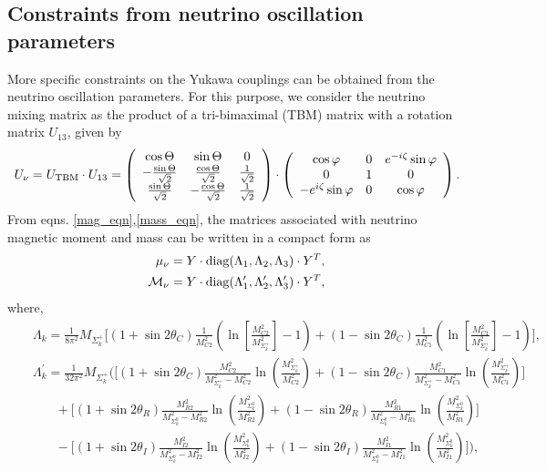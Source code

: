 \documentclass[aps, a4paper,superscriptaddress,12pt,preprintnumbers,floatfix,nofootinbib,amsmath,amssymb]{revtex4}
\newcommand{\nn}{\nonumber}
\begin{document}
\subsection{Constraints from neutrino oscillation parameters}
More specific constraints on the Yukawa couplings can be obtained from the neutrino oscillation parameters. For this purpose, we consider the neutrino mixing matrix as the product of a tri-bimaximal (TBM) matrix  with a rotation matrix $U_{13}$, given by
\begin{equation}
U_\nu = U_{\rm TBM}\cdot U_{13} = \left(\begin{array}{ccc}
\cos\Theta & \sin\Theta & 0 \\
-\frac{\sin\Theta}{\sqrt 2} & \frac{\cos\Theta}{\sqrt 2} & 
\frac{1}{\sqrt 2}\\
\frac{\sin\Theta}{\sqrt 2} & -\frac{\cos\Theta}{\sqrt 2} & 
\frac{1}{\sqrt 2}\\
\end{array}\right)\cdot   \left ( \begin{array}{ccc}
 \cos \varphi    & 0 & e^{-i  \zeta} \sin \varphi \\
0    & 1    & 0 \\
 -e^{i \zeta} \sin \varphi  & 0   & \cos \varphi\\
\end{array}
\right ).
\end{equation}
From eqns. \ref{mag_eqn},\ref{mass_eqn}, the matrices associated with neutrino magnetic moment and mass can be written in a compact form as
\begin{eqnarray}
    \mu_{\nu} = Y \cdot {\rm diag}(\Lambda_1,\Lambda_2,\Lambda_3)\cdot Y^T,\nn\\
    \mathcal{M}_{\nu} = Y \cdot {\rm diag}(\Lambda^\prime_1,\Lambda^\prime_2,\Lambda^\prime_3) \cdot Y^T,
    \label{eq:28}
\end{eqnarray}
where, 
\begin{eqnarray}
&&\Lambda_k = \frac{1}{8\pi^{2}}M_{\Sigma^+_k}   \bigg[(1+\sin 2\theta_C)\frac{1}{M^{2}_{C2}} \left(\ln \left[\frac{M^{2}_{C2}}{M^2_{\Sigma^+_k}}\right]-1\right)+ (1-\sin 2\theta_C)\frac{1}{M^{2}_{C1}} \left(\ln \left[\frac{M^{2}_{C1}}{M^2_{\Sigma^+_k}}\right]-1\right) \bigg],\nn\\
&&\Lambda^\prime_k = \frac{1}{32 \pi^{2}}M_{\Sigma^+_k}
 \Bigg(\Bigg[(1+\sin2\theta_C)\frac{M_{C2}^2}{M_{\Sigma^+_k}^{2}-M_{C2}^2}\ln\left(\frac{M^2_{\Sigma^+_k}}{M^2_{C2}}\right) + (1-\sin2\theta_C)\frac{M_{C1}^2}{M_{\Sigma^+_k}^{2} -  M_{C1}^2}\ln\left(\frac{M^2_{\Sigma^+_k}}{M^2_{C1}}\right)  \Bigg]  \nonumber\\
&&~~~~~~~~+ \Bigg[(1+\sin2\theta_R)\frac{M_{R2}^2}{M_{\Sigma^0_k}^{2}-M_{R2}^2}\ln\left(\frac{M^2_{\Sigma^0_k}}{M^2_{R2}}\right)+ (1-\sin2\theta_R)\frac{M_{R1}^2}{M_{\Sigma^0_k}^{2} -  M_{R1}^2}\ln\left(\frac{M^2_{\Sigma^0_k}}{M^2_{R1}}\right)  \Bigg]  \nonumber\\
 &&~~~~~~~~-\Bigg[(1+\sin2\theta_I)\frac{M_{I2}^2}{M_{\Sigma^0_k}^{2}-M_{I2}^2}\ln\left(\frac{M^2_{\Sigma^0_k}}{M^2_{I2}}\right)+ (1-\sin2\theta_I)\frac{M_{I1}^2}{M_{\Sigma^0_k}^{2} -  M_{I1}^2}\ln\left(\frac{M^2_{\Sigma^0_k}}{M^2_{I1}}\right)  \Bigg]\Bigg),\nn\\
\end{eqnarray}
\end{document}
